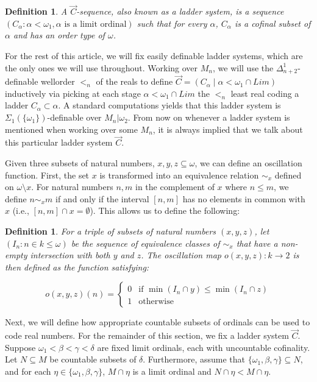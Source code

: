\documentclass[a4paper,11pt]{article}
\newtheorem{definition}[theorem]{Definition}
\begin{document}
\begin{definition}
A $\vec{C}$-sequence, also known as a ladder system, is a sequence $(C_{\alpha} : \alpha < \omega_1, \alpha \text{ is a limit ordinal})$ such that for every $\alpha$, $C_{\alpha}$ is a cofinal subset of $\alpha$ and has an order type of $\omega$.
\end{definition}

For the rest of this article, we will fix easily definable ladder systems, which are the only ones we will use throughout. Working over $M_n$, we will use the $\Delta^1_{n+2}$-definable wellorder $<_n$ of the
reals to define $\vec{C}= ( C_{\alpha} \mid \alpha < \omega_1 \cap Lim)$ inductively via picking at each stage $\alpha < \omega_1 \cap  Lim$ the $<_n$ least real coding a ladder $C_{\alpha} \subset \alpha$. A standard computations yields that this ladder system is $\Sigma_1 (\{ \omega_1 \} )$-definable over $M_n | \omega_2$. From now on whenever a ladder system is mentioned when working over some $M_n$, it is always implied that we talk about this particular ladder system $\vec{C}$.

Given three subsets of natural numbers, $x, y, z \subseteq \omega$, we can define an oscillation function. First, the set $x$ is transformed into an equivalence relation $\sim_x$ defined on $\omega \setminus x$. For natural numbers $n, m$ in the complement of $x$ where $n \leq m$, we define $n \sim_x m$ if and only if the interval $[n,m]$ has no elements in common with $x$ (i.e., $[n,m] \cap x = \emptyset$). This allows us to define the following:

\begin{definition}
For a triple of subsets of natural numbers $(x,y,z)$, let $(I_n : n \in k \leq \omega)$ be the sequence of equivalence classes of $\sim_x$ that have a non-empty intersection with both $y$ and $z$. The oscillation map $o(x,y,z): k \rightarrow 2$ is then defined as the function satisfying:

$$o(x,y,z)(n) = \begin{cases} 0 & \text{if } \min(I_n \cap y) \leq \min(I_n \cap z) \\ 1 & \text{otherwise} \end{cases}$$
\end{definition}

Next, we will define how appropriate countable subsets of ordinals can be used to code real numbers. For the remainder of this section, we fix a ladder system $\vec{C}$. Suppose $\omega_1 < \beta < \gamma < \delta$ are fixed limit ordinals, each with uncountable cofinality. Let $N \subseteq M$ be countable subsets of $\delta$. Furthermore, assume that $\{ \omega_1, \beta, \gamma\} \subseteq N$, and for each $\eta \in \{ \omega_1, \beta, \gamma\}$, $M \cap \eta$ is a limit ordinal and $N \cap \eta < M \cap \eta$.
\end{document}
